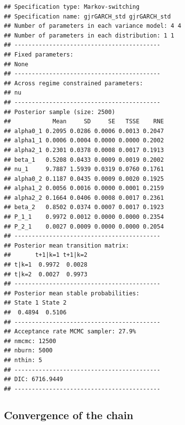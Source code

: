\documentclass[
]{article}
\begin{document}
\begin{verbatim}
## Specification type: Markov-switching
## Specification name: gjrGARCH_std gjrGARCH_std
## Number of parameters in each variance model: 4 4
## Number of parameters in each distribution: 1 1
## ------------------------------------------
## Fixed parameters:
## None
## ------------------------------------------
## Across regime constrained parameters:
## nu 
## ------------------------------------------
## Posterior sample (size: 2500)
##            Mean     SD     SE   TSSE    RNE
## alpha0_1 0.2095 0.0286 0.0006 0.0013 0.2047
## alpha1_1 0.0006 0.0004 0.0000 0.0000 0.2002
## alpha2_1 0.2301 0.0378 0.0008 0.0017 0.1913
## beta_1   0.5208 0.0433 0.0009 0.0019 0.2002
## nu_1     9.7887 1.5939 0.0319 0.0760 0.1761
## alpha0_2 0.1187 0.0435 0.0009 0.0020 0.1925
## alpha1_2 0.0056 0.0016 0.0000 0.0001 0.2159
## alpha2_2 0.1664 0.0406 0.0008 0.0017 0.2361
## beta_2   0.8502 0.0374 0.0007 0.0017 0.1923
## P_1_1    0.9972 0.0012 0.0000 0.0000 0.2354
## P_2_1    0.0027 0.0009 0.0000 0.0000 0.2054
## ------------------------------------------
## Posterior mean transition matrix:
##       t+1|k=1 t+1|k=2
## t|k=1  0.9972  0.0028
## t|k=2  0.0027  0.9973
## ------------------------------------------
## Posterior mean stable probabilities:
## State 1 State 2 
##  0.4894  0.5106 
## ------------------------------------------
## Acceptance rate MCMC sampler: 27.9%
## nmcmc: 12500
## nburn: 5000
## nthin: 5
## ------------------------------------------
## DIC: 6716.9449
## ------------------------------------------
\end{verbatim}

\hypertarget{convergence-of-the-chain}{%
\subsection{Convergence of the chain}\label{convergence-of-the-chain}}
\end{document}
